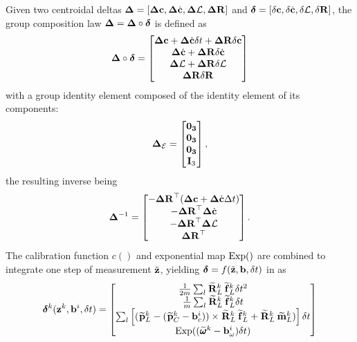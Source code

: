 Given two centroidal deltas ${{\bm \Delta}}=[{{\bm \Delta}}{\bf c},{{\bm \Delta}}\dot{{\bf c}},{{\bm \Delta}}\mathcal{L}, {\bm \Delta {\bf R}}]$ and ${\bm \delta}=[\delta{\bf c},\delta\dot{{\bf c}},\delta\mathcal{L}, {\delta{\bf R}}]$, 
the group composition law ${{\bm \Delta}}={{\bm \Delta}}\circ\bm\delta$ is defined as
%
\begin{equation} 
    \D \circ \bm\delta
    =
    \begin{bmatrix}
        \D\COM + \D\COMd\dt + \DR\delta\COM \\
        \D\COMd + \DR\delta\COMd \\
        \D\AM + \DR\delta\AM \\
        \DR\dR 
    \end{bmatrix}
    \label{eq:composition_delta_com}
\end{equation}
%
with a group identity element composed of the identity element of its components:
%
\begin{equation}
    {{\bm \Delta}}_{\mathcal{E}} = \begin{bmatrix}
    \bf0_3\\ \bf0_3 \\ \bf0_3 \\ {\bf I}_3
    \end{bmatrix},
\end{equation}
%
the resulting inverse being
%
\begin{equation}
    \D^{-1} =     
    \begin{bmatrix}
    - \DR\tr(\D\COM + \D\COMd \Dt) \\
    - \DR\tr \D\COMd \\
    - \DR\tr \D\AM \\
      \DR\tr
    \end{bmatrix}.
\label{eq:inverse_delta_com}
\end{equation}
%
The calibration function $c()$ and exponential map $\operatorname*{Exp}()$ are combined to integrate one step of measurement $\tilde{{\bf z}}$,
yielding $\bm\delta=f(\tilde{{\bf z}},{\bf b},\delta t)$ in  as
%
\begin{equation}
    \bm\delta^{k}(\bfz^k, \bfb^i, \dt) =
    \begin{bmatrix}
    \frac{1}{2m} \sum_l \Rotm{}{L}^k \forcem{}{L}^k \dt^2
    \\
    \frac{1}{m} \sum_l \Rotm{}{L}^k \forcem{}{L}^k \dt 
    \\
    \sum_l\left[ (\posim{}{L}^k - (\posim{}{C}^k - \bias_c^i)) \times \Rotm{}{L}^k \forcem{}{L}^k + \Rotm{}{L}^k\torquem{}{L}^k) \right] \dt
    \\
    \Exp((\angvelm{}{}^k - \bias_{\omega}^i)\dt)
    \end{bmatrix}
    \label{eq:data2delta_com}
\end{equation}



